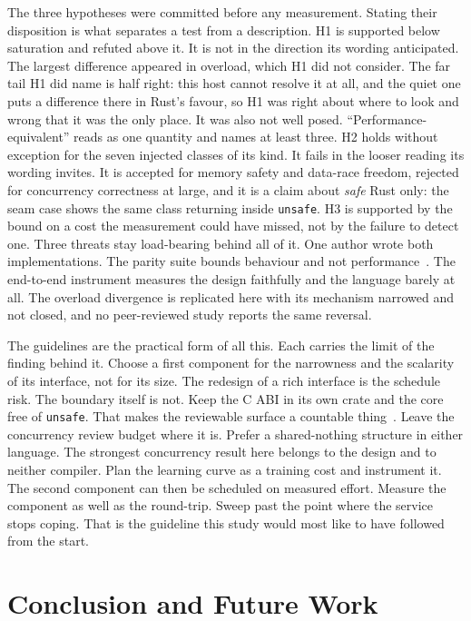 \documentclass[english,twoside,openright,a4paper,censored,csm,software-track-2020]{HYthesisML}
\begin{document}
The three hypotheses were committed before any measurement. Stating their disposition is
what separates a test from a description. H1 is supported below saturation and refuted
above it. It is not in the direction its wording anticipated. The largest difference
appeared in overload, which H1 did not consider. The far tail H1 did name is half right:
this host cannot resolve it at all, and the quiet one puts a difference there in Rust's
favour, so H1 was right about where to look and wrong that it was the only place. It was
also not well posed.
``Performance-equivalent'' reads as one quantity and names at least three. H2 holds
without exception for the seven injected classes of its kind. It fails in the looser
reading its wording invites. It is accepted for memory safety and data-race freedom,
rejected for concurrency correctness at large, and it is a claim about \emph{safe} Rust
only: the seam case shows the same class returning inside \texttt{unsafe}. H3 is supported by the bound on a cost the
measurement could have missed, not by the failure to detect one. Three threats stay
load-bearing behind all of it. One author wrote both implementations. The parity suite
bounds behaviour and not performance~\cite{emberg2023asn1}. The end-to-end instrument
measures the design faithfully and the language barely at all. The overload divergence
is replicated here with its mechanism narrowed and not closed, and no peer-reviewed study
reports the same reversal.

The guidelines are the practical form of all this. Each carries the limit of the
finding behind it. Choose a first component for the narrowness and the scalarity of its
interface, not for its size. The redesign of a rich interface is the schedule risk. The
boundary itself is not. Keep the C ABI in its own crate and the core free of
\texttt{unsafe}. That makes the reviewable surface a countable
thing~\cite{evans2020rust}. Leave the concurrency review budget where it is. Prefer a
shared-nothing structure in either language. The strongest concurrency result here
belongs to the design and to neither compiler. Plan the learning curve as a training
cost and instrument it. The second component can then be scheduled on measured effort.
Measure the component as well as the round-trip. Sweep past the point where the service
stops coping. That is the guideline this study would most like to have followed from the
start.

\chapter{Conclusion and Future Work\label{chapter:conclusions}}
\end{document}
